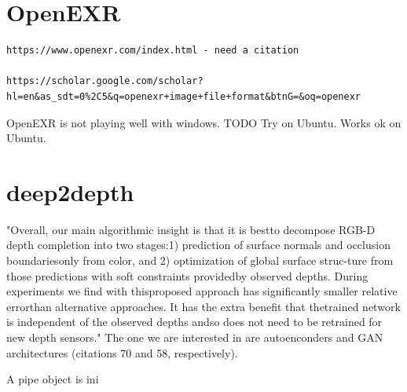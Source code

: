 \section{OpenEXR}
\begin{verbatim}
https://www.openexr.com/index.html - need a citation

https://scholar.google.com/scholar?hl=en&as_sdt=0%2C5&q=openexr+image+file+format&btnG=&oq=openexr
\end{verbatim}

OpenEXR is not playing well with windows. TODO Try on Ubuntu. Works ok on Ubuntu.

\section{deep2depth}
"Overall,  our  main  algorithmic  insight  is  that  it  is  bestto  decompose  RGB-D  depth  completion  into  two  stages:1) prediction of surface normals and occlusion boundariesonly from color, and 2) optimization of global surface struc-ture from those predictions with soft constraints providedby observed depths.  During experiments we find with thisproposed  approach  has  significantly  smaller  relative  errorthan alternative approaches. It has the extra benefit that thetrained network is independent of the observed depths andso does not need to be retrained for new depth sensors."  
The one we are interested in are autoenconders and GAN architectures (citations 70 and 58, respectively).




A pipe object is ini



